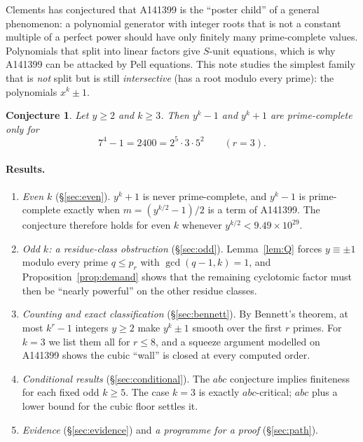 \documentclass[11pt]{article}
\newtheorem{conjecture}[theorem]{Conjecture}
\theoremstyle{definition}
\theoremstyle{remark}
\begin{document}
Clements has conjectured that A141399 is the ``poster child'' of a general
phenomenon: a polynomial generator with integer roots that is not 
a constant multiple of a perfect
power should have only finitely many prime-complete values. Polynomials that split into
linear factors give $S$-unit equations, which is why A141399 can be attacked by
Pell equations. This note studies the simplest family that is \emph{not}
split but is still \emph{intersective} (has a root modulo every prime): the
polynomials $x^k\pm1$.

\begin{conjecture}\label{conj:main}
Let $y\ge2$ and $k\ge3$. Then $y^k-1$ and $y^k+1$ are prime-complete only for
\[
7^4-1=2400=2^5\cdot3\cdot5^2\qquad(r=3).
\]
\end{conjecture}

\paragraph{Results.}
\begin{enumerate}
\item \emph{Even $k$} (\S\ref{sec:even}). $y^k+1$ is never prime-complete, and
$y^k-1$ is prime-complete exactly when $m=(y^{k/2}-1)/2$ is a term of A141399.
The conjecture therefore holds for even $k$ whenever $y^{k/2}<9.49\times10^{29}$.
\item \emph{Odd $k$: a residue-class obstruction} (\S\ref{sec:odd}).
Lemma~\ref{lem:Q} forces $y\equiv\pm1$ modulo every prime $q\le p_r$ with
$\gcd(q-1,k)=1$, and Proposition~\ref{prop:demand} shows that the remaining
cyclotomic factor must then be ``nearly powerful'' on the other residue classes.
\item \emph{Counting and exact classification} (\S\ref{sec:bennett}). By
Bennett's theorem, at most $k^r-1$ integers $y\ge2$ make $y^k\pm1$ smooth over
the first $r$ primes. For $k=3$ we list them all for $r\le8$, and a squeeze
argument modelled on A141399 shows the cubic ``wall'' is closed at every
computed order.
\item \emph{Conditional results} (\S\ref{sec:conditional}). The $abc$ conjecture
implies finiteness for each fixed odd $k\ge5$. The case $k=3$ is exactly
$abc$-critical; $abc$ plus a lower bound for the cubic floor settles it.
\item \emph{Evidence} (\S\ref{sec:evidence}) and \emph{a programme for a proof}
(\S\ref{sec:path}).
\end{enumerate}

\end{document}

